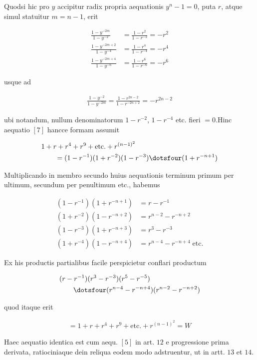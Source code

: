 Quodsi hic pro $y$ accipitur radix propria aequationis $y^n-1=0$, puta $r$, atque simul statuitur $m=n-1$, erit

\[
\begin{aligned}
\frac{1-y^{-2m}}{1-y^{-2}}&=\frac{1-r^2}{1-r^{-2}}=-r^2\\
\frac{1-y^{-2m+2}}{1-y^{-4}}&=\frac{1-r^4}{1-r^{-4}}=-r^4\\
\frac{1-y^{-2m+4}}{1-y^{-6}}&=\frac{1-r^6}{1-r^{-6}}=-r^6
\end{aligned}
\]

usque ad

\[
\begin{aligned}
\frac{1-y^{-2}}{1-y^{-2m}}=\frac{1-r^{2n-2}}{1-r^{-2n+2}}=-r^{2n-2}
\end{aligned}
\]

ubi notandum, nullum denominatorum $1-r^{-2}$, $1-r^{-4}$ etc. fieri $=0$.\quad Hinc aequatio $[7]$ hancce formam assumit

\[
\begin{aligned}
&1+r+r^4+r^9+\text{etc.}+r^{(n-1)^2}\\&\qquad=(1-r^{-1})(1+r^{-2})(1-r^{-3})\dotsfour(1+r^{-n+1})
\end{aligned}
\]

Multiplicando in membro secundo huius aequationis terminum primum per ultimum, secundum per penultimum etc., habemus

\[
\begin{aligned}
(1-r^{-1})(1+r^{-n+1})&=r-r^{-1}\\
(1+r^{-2})(1-r^{-n+2})&=r^{n-2}-r^{-n+2}\\
(1-r^{-3})(1+r^{-n+3})&=r^3-r^{-3}\\
(1+r^{-4})(1-r^{-n+4})&=r^{n-4}-r^{-n+4}\;\text{etc.}
\end{aligned}
\]

Ex his productis partialibus facile perspicietur conflari productum

\[
\begin{aligned}
&(r-r^{-1})(r^3-r^{-3})(r^5-r^{-5})\\&\qquad\dotsfour(r^{n-4}-r^{-n+4})(r^{n-2}-r^{-n+2})
\end{aligned}
\]

quod itaque erit

\[
\begin{aligned}
=1+r+r^4+r^9+\text{etc.}+r^{(n-1)^2}=W
\end{aligned}
\]

Haec aequatio identica est cum aequ. $[5]$ in art. $12$ e progressione prima derivata, ratiociniaque dein reliqua eodem modo adstruentur, ut in artt. $13$ et $14$.


